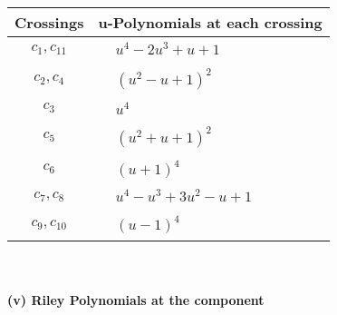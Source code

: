 \documentclass[1p]{elsarticle_modified}
\theoremstyle{definition}
\begin{document}
\begin{tabular}{m{50pt}|m{274pt}}
Crossings & \hspace{64pt}u-Polynomials at each crossing \\
\hline $$\begin{aligned}c_{1},c_{11}\end{aligned}$$&$\begin{aligned}
&u^4-2 u^3+u+1
\end{aligned}$\\
\hline $$\begin{aligned}c_{2},c_{4}\end{aligned}$$&$\begin{aligned}
&(u^2- u+1)^2
\end{aligned}$\\
\hline $$\begin{aligned}c_{3}\end{aligned}$$&$\begin{aligned}
&u^4
\end{aligned}$\\
\hline $$\begin{aligned}c_{5}\end{aligned}$$&$\begin{aligned}
&(u^2+u+1)^2
\end{aligned}$\\
\hline $$\begin{aligned}c_{6}\end{aligned}$$&$\begin{aligned}
&(u+1)^4
\end{aligned}$\\
\hline $$\begin{aligned}c_{7},c_{8}\end{aligned}$$&$\begin{aligned}
&u^4- u^3+3 u^2- u+1
\end{aligned}$\\
\hline $$\begin{aligned}c_{9},c_{10}\end{aligned}$$&$\begin{aligned}
&(u-1)^4
\end{aligned}$\\
\hline
\end{tabular}\\~\\
\newpage\renewcommand{\arraystretch}{1}
\flushleft \textbf{(v) Riley Polynomials at the component}\newline \\
\end{document}

